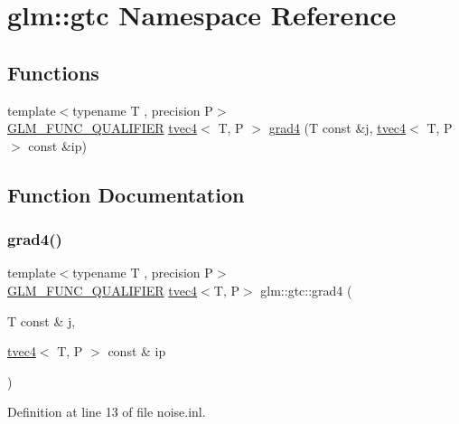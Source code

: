 \hypertarget{namespaceglm_1_1gtc}{}\section{glm\+::gtc Namespace Reference}
\label{namespaceglm_1_1gtc}
\subsection*{Functions}
\begin{DoxyCompactItemize}
\item 
{\footnotesize template$<$typename T , precision P$>$ }\\\mbox{\hyperlink{setup_8hpp_a33fdea6f91c5f834105f7415e2a64407}{G\+L\+M\+\_\+\+F\+U\+N\+C\+\_\+\+Q\+U\+A\+L\+I\+F\+I\+ER}} \mbox{\hyperlink{structglm_1_1tvec4}{tvec4}}$<$ T, P $>$ \mbox{\hyperlink{namespaceglm_1_1gtc_a5c4a3d973c67fd78ab6bc8f993d172ac}{grad4}} (T const \&\mbox{\hyperlink{glad_8h_a1fb4b4dc7b41b62604a44f280bccbd54}{j}}, \mbox{\hyperlink{structglm_1_1tvec4}{tvec4}}$<$ T, P $>$ const \&ip)
\end{DoxyCompactItemize}


\subsection{Function Documentation}
\mbox{\label{namespaceglm_1_1gtc_a5c4a3d973c67fd78ab6bc8f993d172ac}} 
\subsubsection{\texorpdfstring{grad4()}{grad4()}}
{\footnotesize\ttfamily template$<$typename T , precision P$>$ \\
\mbox{\hyperlink{setup_8hpp_a33fdea6f91c5f834105f7415e2a64407}{G\+L\+M\+\_\+\+F\+U\+N\+C\+\_\+\+Q\+U\+A\+L\+I\+F\+I\+ER}} \mbox{\hyperlink{structglm_1_1tvec4}{tvec4}}$<$T, P$>$ glm\+::gtc\+::grad4 (\begin{DoxyParamCaption}\item[{T const \&}]{j,  }\item[{\mbox{\hyperlink{structglm_1_1tvec4}{tvec4}}$<$ T, P $>$ const \&}]{ip }\end{DoxyParamCaption})}



Definition at line 13 of file noise.\+inl.


